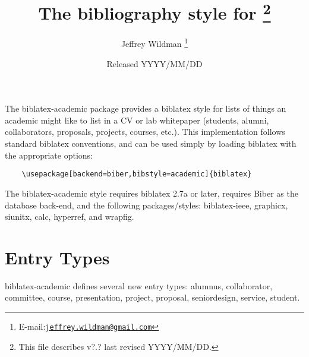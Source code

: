 \documentclass[11pt,letterpaper]{article}
\author{Jeffrey Wildman%
  \thanks{E-mail:\href{mailto:jeffrey.wildman@gmail.com}%
  {\texttt{jeffrey.wildman@gmail.com}}}
}
\title{The \pkg{academic} bibliography style for \pkg{biblatex}%
  \footnote{This file describes v?.? last revised YYYY/MM/DD.}%
}
\date{Released YYYY/MM/DD}
\newcommand{\pkg}[1]{\textsf{#1}}
\newcommand{\entry}[1]{\textsf{#1}}
\begin{document}
\maketitle

The \pkg{biblatex-academic} package provides a \pkg{biblatex} style for lists of things an academic might like to list in a CV or lab whitepaper (students, alumni, collaborators, proposals, projects, courses, etc.).
This implementation follows standard \pkg{biblatex} conventions, and can be used simply by loading \pkg{biblatex} with the appropriate options:
\begin{verbatim}
    \usepackage[backend=biber,bibstyle=academic]{biblatex}
\end{verbatim}
The \pkg{biblatex-academic} style requires \pkg{biblatex} 2.7a or later, requires \pkg{Biber} as the database back-end, and the following packages/styles: \pkg{biblatex-ieee}, \pkg{graphicx}, \pkg{siunitx}, \pkg{calc}, \pkg{hyperref}, and \pkg{wrapfig}.


\section{Entry Types}\label{sec:entry-types}

\pkg{biblatex-academic} defines several new entry types: 
\entry{alumnus}, 
\entry{collaborator}, 
\entry{committee},
\entry{course}, 
\entry{presentation}, 
\entry{project}, 
\entry{proposal}, 
\entry{seniordesign}, 
\entry{service},
\entry{student}. 
\end{document}
